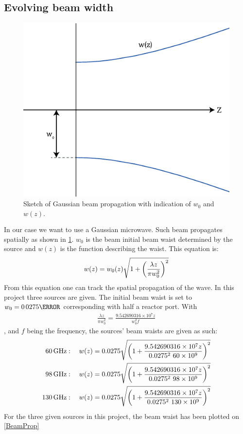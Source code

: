 \subsection{Evolving beam width}
\begin{figure}
	\vspace{-5mm}
	\includegraphics[width=.4\textwidth]{Figures/PropEx.eps}
	\caption{Sketch of Gaussian beam propagation with indication of \(w_0\) and \(w(z)\).}
	\label{PropEx}
\end{figure}
In our case we want to use a Gaussian microwave. Such beam propagates spatially as shown in \cref{PropEx}.
\(w_0\) is the beam initial beam waist determined by the source and \(w(z)\) is the function describing the waist. This equation is:
\begin{align}
	w(z) = w_0(z)\sqrt{1+\pqty{\frac{\lambda z}{\pi w_0^2}}^2}\label{wz}
\end{align}
From this equation one can track the spatial propagation of the wave. In this project three sources are given. The initial beam waist is set to \(w_0=\si{0.0275}{\meter}\) corresponding with half a reactor port. With
\begin{align}
	\frac{\lambda z}{\pi w_0^2} = \frac{9.542690316\times10^7 z}{w_0^2 f}
\end{align}
, and \(f\) being the frequency, the sources' beam waists are given as such:
\begin{align}
	\SI{60}{\giga\hertz}  & : \quad w(z)=0.0275\sqrt{\pqty{1+\frac{9.542690316\times10^7 z}{0.0275^2 \ 60\times10^9}}^2}\label{60}   \\
	\SI{98}{\giga\hertz}  & : \quad w(z)=0.0275\sqrt{\pqty{1+\frac{9.542690316\times10^7 z}{0.0275^2 \ 98\times10^9}}^2}\label{98}   \\
	\SI{130}{\giga\hertz} & : \quad w(z)=0.0275\sqrt{\pqty{1+\frac{9.542690316\times10^7 z}{0.0275^2 \ 130\times10^9}}^2}\label{130}
\end{align}
For the three given sources in this project, the beam waist has been plotted on \cref{BeamProp}
\newline


